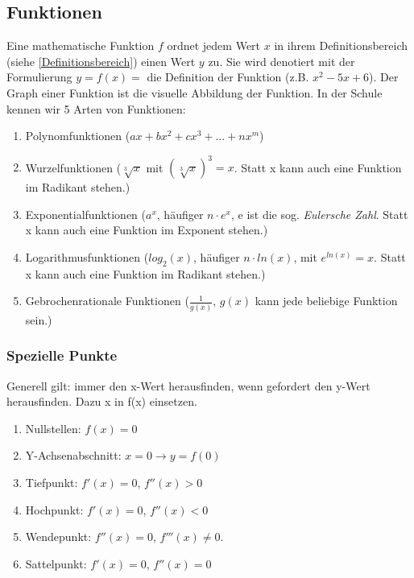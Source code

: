 \documentclass{article}
\begin{document}
	\subsection{Funktionen}
		Eine mathematische Funktion $f$ ordnet jedem Wert $x$ in ihrem Definitionsbereich (siehe \ref{Definitionsbereich})
		einen Wert $y$ zu. Sie wird denotiert mit der Formulierung $y=f(x)= $ die Definition der Funktion (z.B. $x^2-5x+6$).
		Der Graph einer Funktion ist die visuelle Abbildung der Funktion. In der Schule kennen wir 5 Arten von Funktionen:
		\begin{enumerate}
		    \item Polynomfunktionen ($ax+bx^2+cx^3+...+nx^m$)
		    \item Wurzelfunktionen ($ \sqrt[3]{x} $ mit $ (\sqrt[3]{x})^3=x $. Statt x kann auch eine Funktion im Radikant stehen.)
		    \item Exponentialfunktionen ($a^{x}$, häufiger $n \cdot e^x$, e ist die sog. \emph{Eulersche Zahl}. Statt x kann auch eine Funktion im Exponent stehen.)
		    \item Logarithmusfunktionen ($log_2(x)$, häufiger $n \cdot ln(x)$, mit $e^{ln(x)}=x$. Statt x kann auch eine Funktion im Radikant stehen.)
		    \item Gebrochenrationale Funktionen ($\frac{1}{g(x)}$, $g(x)$ kann jede beliebige Funktion sein.)
		
		\end{enumerate}

		\subsubsection{Spezielle Punkte}\label{Spezielle Punkte}

		Generell gilt: immer den x-Wert herausfinden, wenn gefordert den y-Wert herausfinden. Dazu x in f(x) einsetzen.

		\begin{enumerate}
		    \item Nullstellen: $f(x)=0$
		    \item Y-Achsenabschnitt: $x=0 \rightarrow y=f(0)$
		    \item Tiefpunkt: $f'(x)=0$, $f''(x)>0$
		    \item Hochpunkt: $f'(x)=0$, $f''(x)<0$
		    \item Wendepunkt: $f''(x)=0$, $f'''(x)\neq 0$.
		    \item Sattelpunkt: $f'(x)=0$, $f''(x)=0$
		\end{enumerate}
\end{document}
